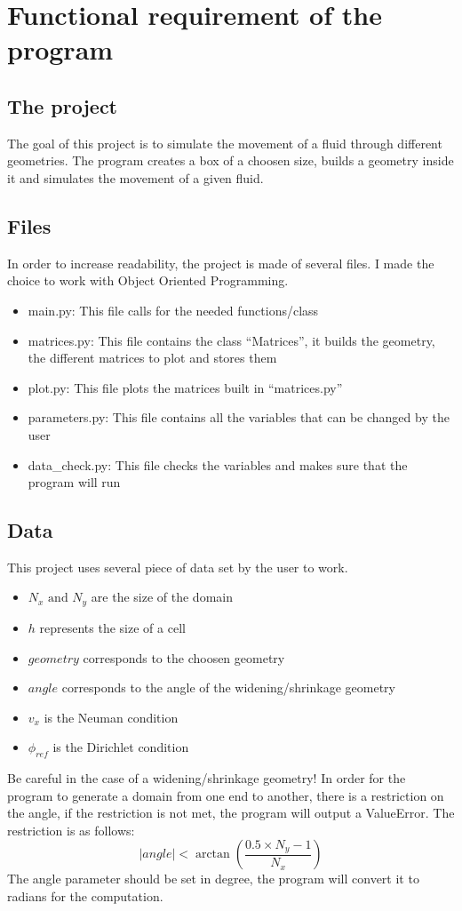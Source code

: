 \section{Functional requirement of the program}
\subsection{The project}
The goal of this project is to simulate the movement of a fluid through
different geometries. The program creates a box of a choosen size, builds a
geometry inside it and simulates the movement of a given fluid.

\subsection{Files}
In order to increase readability, the project is made of several files.
I made the choice to work with Object Oriented Programming.
\begin{itemize}
      \item main.py: This file calls for the needed functions/class
      \item matrices.py: This file contains the class ``Matrices'', it builds the
          geometry, the different matrices to plot and stores them
       \item plot.py: This file plots the matrices built in ``matrices.py''
       \item parameters.py: This file contains all the variables that can be 
          changed by the user
       \item data\_check.py: This file checks the variables and makes sure that
          the program will run
\end{itemize}

\subsection{Data}
This project uses several piece of data set by the user to work.
\begin{itemize}
      \item $N_x \text{ and } N_y$ are the size of the domain
      \item $h$ represents the size of a cell
      \item $geometry$ corresponds to the choosen geometry
      \item $angle$ corresponds to the angle of the widening/shrinkage geometry
      \item $v_x$ is the Neuman condition
      \item $\phi_{ref}$ is the Dirichlet condition
\end{itemize}
Be careful in the case of a widening/shrinkage geometry!
In order for the program to generate a domain from one end to another, there is
a restriction on the angle, if the restriction is not met, the program will
output a ValueError. The restriction is as follows:
\[
      |angle| < \arctan{\left(\dfrac{0.5 \times N_y - 1}{N_x}\right)}
\]
The angle parameter should be set in degree, the program will convert it to
radians for the computation.

